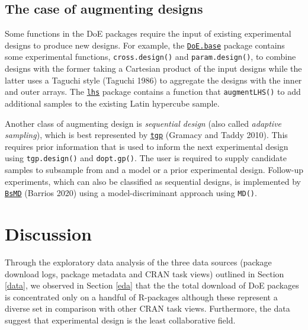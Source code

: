 \documentclass{article}
\begin{document}
\hypertarget{the-case-of-augmenting-designs}{%
\subsection{The case of augmenting
designs}\label{the-case-of-augmenting-designs}}

Some functions in the DoE packages require the input of existing
experimental designs to produce new designs. For example, the
\href{https://cran.r-project.org/web/packages/DoE.base/index.html}{\texttt{DoE.base}}
package contains some experimental functions, \texttt{cross.design()}
and \texttt{param.design()}, to combine designs with the former taking a
Cartesian product of the input designs while the latter uses a Taguchi
style (Taguchi 1986) to aggregate the designs with the inner and outer
arrays. The
\href{https://cran.r-project.org/web/packages/lhs/index.html}{\texttt{lhs}}
package contains a function that \texttt{augmentLHS()} to add additional
samples to the existing Latin hypercube sample.

Another class of augmenting design is \emph{sequential design} (also
called \emph{adaptive sampling}), which is best represented by
\href{https://cran.r-project.org/web/packages/tgp/index.html}{\texttt{tgp}}
(Gramacy and Taddy 2010). This requires prior information that is used
to inform the next experimental design using \texttt{tgp.design()} and
\texttt{dopt.gp()}. The user is required to supply candidate samples to
subsample from and a model or a prior experimental design. Follow-up
experiments, which can also be classified as sequential designs, is
implemented by
\href{https://cran.r-project.org/web/packages/BsMD/index.html}{\texttt{BsMD}}
(Barrios 2020) using a model-discriminant approach using \texttt{MD()}.

\hypertarget{discussion}{%
\section{Discussion}\label{discussion}}

Through the exploratory data analysis of the three data sources (package
download logs, package metadata and CRAN task views) outlined in Section
\ref{data}, we observed in Section \ref{eda} that the the total download
of DoE packages is concentrated only on a handful of R-packages although
these represent a diverse set in comparison with other CRAN task views.
Furthermore, the data suggest that experimental design is the least
collaborative field.
\end{document}
